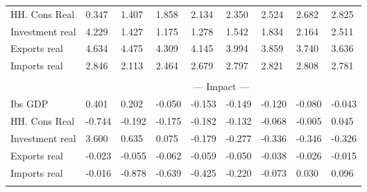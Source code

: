 \documentclass{article}
\begin{document}
\begin{table}
\begin{tabular}{lllllllll}
HH. Cons Real &                0.347 &                1.407 &                1.858 &                2.134 &                2.350 &                2.524 &                2.682 &                2.825 \\
Investment real &                4.229 &                1.427 &                1.175 &                1.278 &                1.542 &                1.834 &                2.164 &                2.511 \\
Exports real &                4.634 &                4.475 &                4.309 &                4.145 &                3.994 &                3.859 &                3.740 &                3.636 \\
Imports real &                2.846 &                2.113 &                2.464 &                2.679 &                2.797 &                2.821 &                2.808 &                2.781 \\
&\multicolumn{8}{c}{     }                                                                                                                                                                 \\
&\multicolumn{8}{c}{--- Impact ---}                                                                                                                                                                 \\
Ibs GDP &                0.401 &                0.202 &               -0.050 &               -0.153 &               -0.149 &               -0.120 &               -0.080 &               -0.043 \\
HH. Cons Real &               -0.744 &               -0.192 &               -0.175 &               -0.182 &               -0.132 &               -0.068 &               -0.005 &                0.045 \\
Investment real &                3.600 &                0.635 &                0.075 &               -0.179 &               -0.277 &               -0.336 &               -0.346 &               -0.326 \\
Exports real &               -0.023 &               -0.055 &               -0.062 &               -0.059 &               -0.050 &               -0.038 &               -0.026 &               -0.015 \\
Imports real &               -0.016 &               -0.878 &               -0.639 &               -0.425 &               -0.220 &               -0.073 &                0.030 &                0.096 \\
&\multicolumn{8}{c}{     }                                                                                                                                                                 \\
\bottomrule
\end{tabular}
\end{table}
\end{document}
